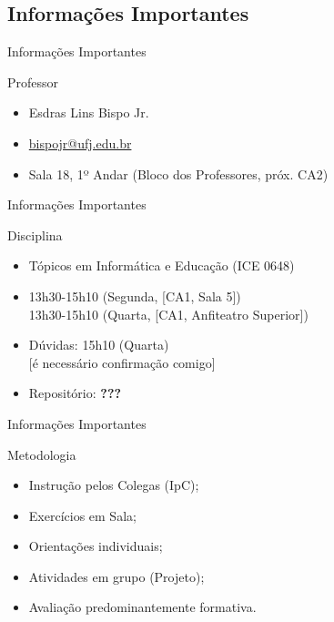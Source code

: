 \documentclass[xcolor=dvipsnames,table]{beamer}
\begin{document}
	\subsection{Informações Importantes}
	\begin{frame}{Informações Importantes}
		\begin{block}{Professor}
			\begin{itemize}
				\item Esdras Lins Bispo Jr.
				\item \url{bispojr@ufj.edu.br}
				\item Sala 18, 1º Andar (Bloco dos Professores, próx. CA2)
			\end{itemize}
		\end{block}
	\end{frame}	
	
	\begin{frame}{Informações Importantes}
		\begin{block}{Disciplina}
			\begin{itemize}
				\item Tópicos em Informática e Educação (ICE 0648)
				\item 13h30-15h10 (Segunda, [CA1, Sala 5])\\
				 13h30-15h10 (Quarta, [CA1, Anfiteatro Superior])
				\item Dúvidas: 15h10 (Quarta)\\
				{\color{red}[é necessário confirmação comigo]}
				\item Repositório: {\bf \color{red} ???}
			\end{itemize}
		\end{block}
	\end{frame}	
	
\begin{frame}{Informações Importantes}
    \begin{block}{Metodologia}
        \begin{itemize}
            \item Instrução pelos Colegas (IpC);
            \item Exercícios em Sala;
            \item Orientações individuais;
            \item Atividades em grupo (Projeto);
            \item Avaliação predominantemente formativa.
        \end{itemize}
    \end{block}
\end{frame}
\end{document}
